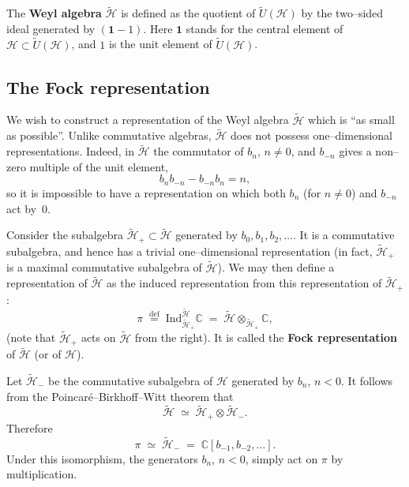 \documentclass[12pt]{article}
\begin{document}
\begin{definition}
     The \textbf{Weyl algebra} $\widetilde{\mathcal{H}}$ is defined as the quotient of $\widetilde{U}(\mathcal{H})$ by the two–sided ideal generated by $(\mathbf{1}-1)$.
    Here $\mathbf{1}$ stands for the central element of $\mathcal{H}\subset\widetilde{U}(\mathcal{H})$, and $1$ is the unit element of $\widetilde{U}(\mathcal{H})$.
\end{definition}

\subsection{The Fock representation}
We wish to construct a representation of the Weyl algebra $\widetilde{\mathcal{H}}$ which is ``as small as possible''.
Unlike commutative algebras, $\widetilde{\mathcal{H}}$ does not possess one–dimensional representations.
Indeed, in $\widetilde{\mathcal{H}}$ the commutator of $b_n$, $n\ne 0$, and $b_{-n}$ gives a non–zero multiple of the unit element,
\begin{equation}\label{2.1.5}
b_n b_{-n} - b_{-n} b_n = n,
\end{equation}
so it is impossible to have a representation on which both $b_n$ (for $n\ne 0$) and $b_{-n}$ act by~$0$.

\medskip

Consider the subalgebra $\widetilde{\mathcal{H}}_+ \subset \widetilde{\mathcal{H}}$ generated by $b_0, b_1, b_2, \dots$.
It is a commutative subalgebra, and hence has a trivial one–dimensional representation
(in fact, $\widetilde{\mathcal{H}}_+$ is a maximal commutative subalgebra of $\widetilde{\mathcal{H}}$).
We may then define a representation of $\widetilde{\mathcal{H}}$ as the induced representation from this representation of $\widetilde{\mathcal{H}}_+$:
\[
\pi \;\stackrel{\mathrm{def}}{=}\; 
\mathrm{Ind}_{\widetilde{\mathcal{H}}_+}^{\widetilde{\mathcal{H}}} \mathbb{C}
\;=\;
\widetilde{\mathcal{H}} \otimes_{\widetilde{\mathcal{H}}_+} \mathbb{C},
\]
(note that $\widetilde{\mathcal{H}}_+$ acts on $\widetilde{\mathcal{H}}$ from the right).
It is called the \textbf{Fock representation} of $\widetilde{\mathcal{H}}$ (or of $\mathcal{H}$).

\medskip

Let $\widetilde{\mathcal{H}}_-$ be the commutative subalgebra of $\mathcal{H}$ generated by $b_n$, $n < 0$.
It follows from the Poincaré–Birkhoff–Witt theorem that
\[
\widetilde{\mathcal{H}} \;\simeq\;
\widetilde{\mathcal{H}}_+ \otimes \widetilde{\mathcal{H}}_-.
\]
Therefore
\[
\pi \;\simeq\; \widetilde{\mathcal{H}}_- \;=\; \mathbb{C}[b_{-1}, b_{-2}, \dots].
\]
Under this isomorphism, the generators $b_n$, $n<0$, simply act on $\pi$ by multiplication.
\end{document}
